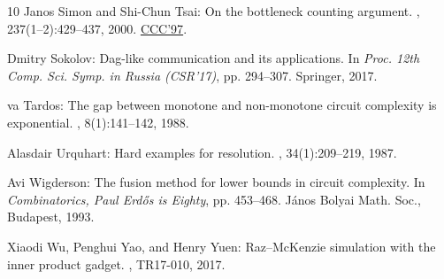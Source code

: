 \documentclass[11pt]{article}
\numberwithin{equation}{section}
\theoremstyle{definition}
\theoremstyle{plain}
\begin{document}
\begin{thebibliography}{10}
{\sc Janos Simon and Shi{-}Chun Tsai}: On the bottleneck counting argument.
, 237(1--2):429--437, 2000.
\newblock \prelim \href{https://doi.org/10.1109/CCC.1997.612324}{CCC'97}.
\newblock [\epfmtdoi{10.1016/S0304-3975(99)00321-7}]

{\sc Dmitry Sokolov}: Dag-like communication and its applications.
\newblock In {\em Proc. 12th Comp. Sci. Symp. in Russia (CSR'17)}, pp.
  294--307. Springer, 2017.
\newblock [\epfmtdoi{10.1007/978-3-319-58747-9\_26}]

{va Tardos}: The gap between monotone and non-monotone circuit
  complexity is exponential.
, 8(1):141--142, 1988.
\newblock [\epfmtdoi{10.1007/BF02122563}]

{\sc Alasdair Urquhart}: Hard examples for resolution.
, 34(1):209--219, 1987.
\newblock [\epfmtdoi{10.1145/7531.8928}]

{\sc Avi Wigderson}: The fusion method for lower bounds in circuit complexity.
\newblock In {\em Combinatorics, Paul Erd{\H{o}}s is Eighty}, pp. 453--468.
  J{\'a}nos Bolyai Math. Soc., Budapest, 1993.

{\sc Xiaodi Wu, Penghui Yao, and Henry Yuen}: {R}az--{M}c{K}enzie simulation
  with the inner product gadget.
, TR17-010, 2017.

\end{thebibliography}
\end{document}
